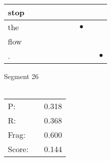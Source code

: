 \documentclass[landscape]{article}
\newcommand{\ssp}{\hspace{2pt}}
\newcommand{\mex}{\cellcolor{g}$\bullet$}
\begin{document}
\begin{tabular}{|l|p{10pt}|p{10pt}|p{10pt}|p{10pt}|p{10pt}|p{10pt}|p{10pt}|p{10pt}|p{10pt}|}
\hline
\ssp stop \ssp&\hspace{2pt}&\hspace{2pt}&\hspace{2pt}&\hspace{2pt}&\hspace{2pt}&\hspace{2pt}&\hspace{2pt}&\hspace{2pt}&\hspace{2pt}\\
\hline
\ssp \cellcolor{ref6}the \ssp&\hspace{2pt}&\hspace{2pt}&\hspace{2pt}&\hspace{2pt}&\hspace{2pt}&\hspace{2pt}&\hspace{2pt}\mex&\hspace{2pt}&\hspace{2pt}\\
\hline
\ssp flow \ssp&\hspace{2pt}&\hspace{2pt}&\hspace{2pt}&\hspace{2pt}&\hspace{2pt}&\hspace{2pt}&\hspace{2pt}&\hspace{2pt}&\hspace{2pt}\\
\hline
\ssp \cellcolor{ref8}. \ssp&\hspace{2pt}&\hspace{2pt}&\hspace{2pt}&\hspace{2pt}&\hspace{2pt}&\hspace{2pt}&\hspace{2pt}&\hspace{2pt}&\hspace{2pt}\mex\\
\hline
\end{tabular}

\vspace{6pt}
\noindent Segment 26\\\\
\noindent\begin{tabular}{lm{12pt}r}
\hline
P:&&0.318\\
R:&&0.368\\
Frag:&&0.600\\
Score:&&0.144\\
\end{tabular}
\end{document}
